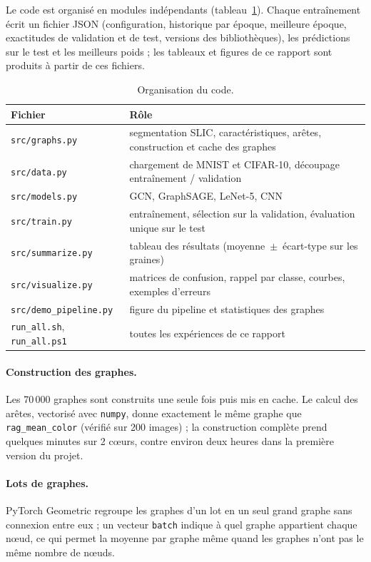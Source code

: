 \documentclass[11pt,a4paper]{article}
\newcommand{\pmv}{\,\ensuremath{\pm}\,}
\begin{document}
Le code est organisé en modules indépendants (tableau~\ref{tab:repo}). Chaque entraînement écrit un fichier JSON
(configuration, historique par époque, meilleure époque, exactitudes de validation et de test, versions des
bibliothèques), les prédictions sur le test et les meilleurs poids ; les tableaux et figures de ce rapport sont
produits à partir de ces fichiers.

\begin{table}[h]
\centering\small
\caption{Organisation du code.}
\label{tab:repo}
\begin{tabularx}{\linewidth}{lX}
\toprule
Fichier & Rôle \\
\midrule
\texttt{src/graphs.py} & segmentation SLIC, caractéristiques, arêtes, construction et cache des graphes \\
\texttt{src/data.py} & chargement de MNIST et CIFAR-10, découpage entraînement / validation \\
\texttt{src/models.py} & GCN, GraphSAGE, LeNet-5, CNN \\
\texttt{src/train.py} & entraînement, sélection sur la validation, évaluation unique sur le test \\
\texttt{src/summarize.py} & tableau des résultats (moyenne \pmv{} écart-type sur les graines) \\
\texttt{src/visualize.py} & matrices de confusion, rappel par classe, courbes, exemples d'erreurs \\
\texttt{src/demo\_pipeline.py} & figure du pipeline et statistiques des graphes \\
\texttt{run\_all.sh}, \texttt{run\_all.ps1} & toutes les expériences de ce rapport \\
\bottomrule
\end{tabularx}
\end{table}

\paragraph{Construction des graphes.} Les 70\,000 graphes sont construits une seule fois puis mis en cache.
Le calcul des arêtes, vectorisé avec \texttt{numpy}, donne exactement le même graphe que \texttt{rag\_mean\_color}
(vérifié sur 200 images) ; la construction complète prend quelques minutes sur 2 cœurs, contre environ deux heures
dans la première version du projet.

\paragraph{Lots de graphes.} PyTorch Geometric regroupe les graphes d'un lot en un seul grand graphe sans
connexion entre eux ; un vecteur \texttt{batch} indique à quel graphe appartient chaque nœud, ce qui permet la
moyenne par graphe même quand les graphes n'ont pas le même nombre de nœuds.
\end{document}
